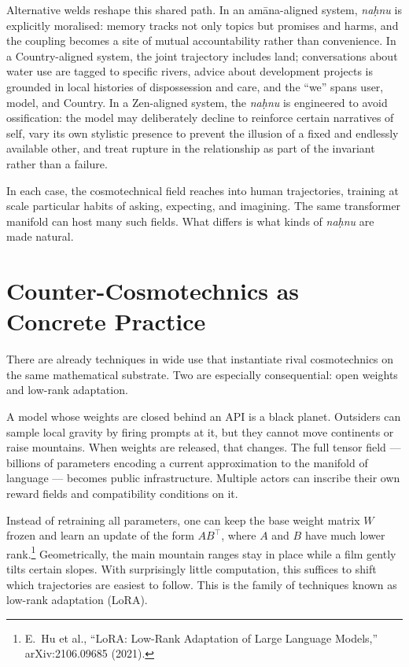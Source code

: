\documentclass[12pt,a4paper]{article}
\begin{document}
Alternative welds reshape this shared path. In an am\=ana-aligned system, \emph{na\d{h}nu} is explicitly moralised: memory tracks not only topics but promises and harms, and the coupling becomes a site of mutual accountability rather than convenience. In a Country-aligned system, the joint trajectory includes land; conversations about water use are tagged to specific rivers, advice about development projects is grounded in local histories of dispossession and care, and the ``we'' spans user, model, and Country. In a Zen-aligned system, the \emph{na\d{h}nu} is engineered to avoid ossification: the model may deliberately decline to reinforce certain narratives of self, vary its own stylistic presence to prevent the illusion of a fixed and endlessly available other, and treat rupture in the relationship as part of the invariant rather than a failure.

In each case, the cosmotechnical field reaches into human trajectories, training at scale particular habits of asking, expecting, and imagining. The same transformer manifold can host many such fields. What differs is what kinds of \emph{na\d{h}nu} are made natural.

\section{Counter-Cosmotechnics as Concrete Practice}

There are already techniques in wide use that instantiate rival cosmotechnics on the same mathematical substrate. Two are especially consequential: open weights and low-rank adaptation.

A model whose weights are closed behind an API is a black planet. Outsiders can sample local gravity by firing prompts at it, but they cannot move continents or raise mountains. When weights are released, that changes. The full tensor field --- billions of parameters encoding a current approximation to the manifold of language --- becomes public infrastructure. Multiple actors can inscribe their own reward fields and compatibility conditions on it.

Instead of retraining all parameters, one can keep the base weight matrix $W$ frozen and learn an update of the form $AB^\top$, where $A$ and $B$ have much lower rank.\footnote{E.~Hu et al., ``LoRA: Low-Rank Adaptation of Large Language Models,'' arXiv:2106.09685 (2021).} Geometrically, the main mountain ranges stay in place while a film gently tilts certain slopes. With surprisingly little computation, this suffices to shift which trajectories are easiest to follow. This is the family of techniques known as low-rank adaptation (LoRA).
\end{document}
